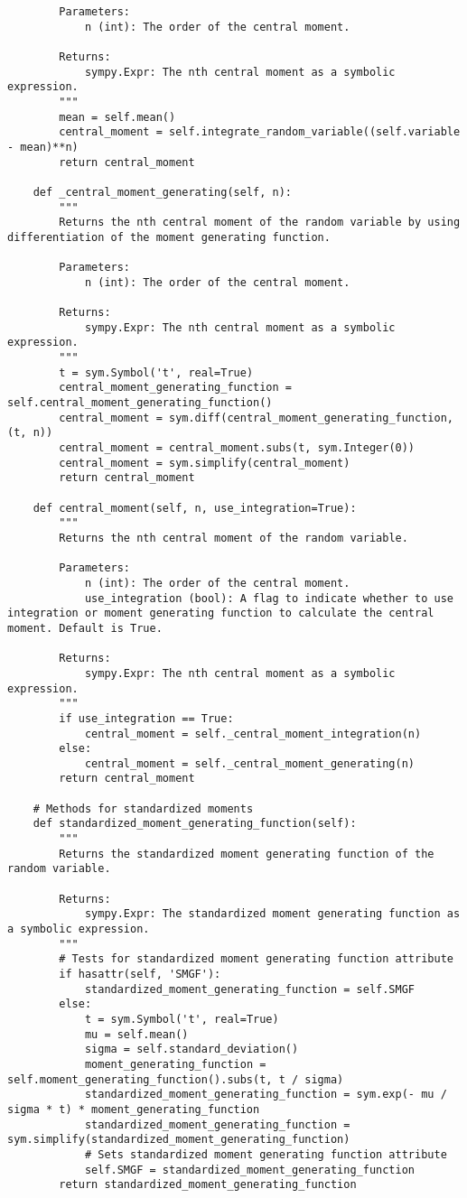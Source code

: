 \begin{small}
\begin{lstlisting}
        Parameters:
            n (int): The order of the central moment.

        Returns:
            sympy.Expr: The nth central moment as a symbolic expression.
        """
        mean = self.mean()
        central_moment = self.integrate_random_variable((self.variable - mean)**n)
        return central_moment

    def _central_moment_generating(self, n):
        """
        Returns the nth central moment of the random variable by using differentiation of the moment generating function.

        Parameters:
            n (int): The order of the central moment.

        Returns:
            sympy.Expr: The nth central moment as a symbolic expression.
        """
        t = sym.Symbol('t', real=True)
        central_moment_generating_function = self.central_moment_generating_function()
        central_moment = sym.diff(central_moment_generating_function, (t, n))
        central_moment = central_moment.subs(t, sym.Integer(0))
        central_moment = sym.simplify(central_moment)
        return central_moment

    def central_moment(self, n, use_integration=True):
        """
        Returns the nth central moment of the random variable.

        Parameters:
            n (int): The order of the central moment.
            use_integration (bool): A flag to indicate whether to use integration or moment generating function to calculate the central moment. Default is True.

        Returns:
            sympy.Expr: The nth central moment as a symbolic expression.
        """
        if use_integration == True:
            central_moment = self._central_moment_integration(n)
        else:
            central_moment = self._central_moment_generating(n)
        return central_moment

    # Methods for standardized moments
    def standardized_moment_generating_function(self):
        """
        Returns the standardized moment generating function of the random variable.

        Returns:
            sympy.Expr: The standardized moment generating function as a symbolic expression.
        """
        # Tests for standardized moment generating function attribute
        if hasattr(self, 'SMGF'):
            standardized_moment_generating_function = self.SMGF
        else:
            t = sym.Symbol('t', real=True)
            mu = self.mean()
            sigma = self.standard_deviation()
            moment_generating_function = self.moment_generating_function().subs(t, t / sigma)
            standardized_moment_generating_function = sym.exp(- mu / sigma * t) * moment_generating_function
            standardized_moment_generating_function = sym.simplify(standardized_moment_generating_function)
            # Sets standardized moment generating function attribute
            self.SMGF = standardized_moment_generating_function
        return standardized_moment_generating_function


\end{lstlisting}
\end{small}
